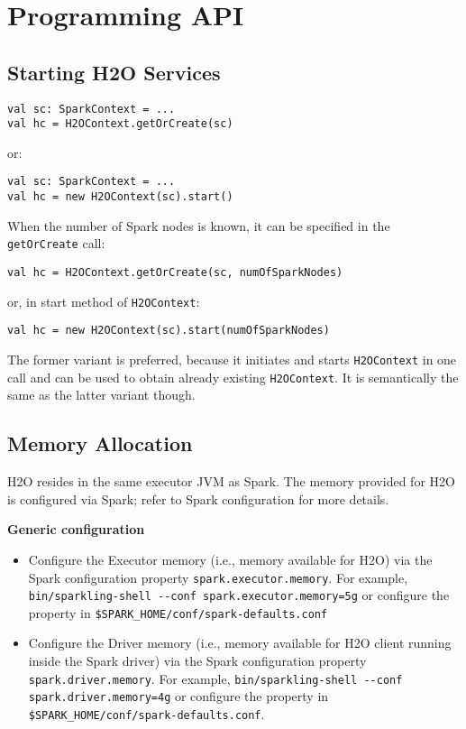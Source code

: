 \section{Programming API}

\subsection{Starting H2O Services}

\begin{lstlisting}[style=Scala]
val sc: SparkContext = ...
val hc = H2OContext.getOrCreate(sc)
\end{lstlisting} 
or:
\begin{lstlisting}[style=Scala]
val sc: SparkContext = ...
val hc = new H2OContext(sc).start()
\end{lstlisting}

When the number of Spark nodes is known, it can be specified in the \texttt{getOrCreate} call:

\begin{lstlisting}[style=Scala]
val hc = H2OContext.getOrCreate(sc, numOfSparkNodes)
\end{lstlisting}
or, in start method of \texttt{H2OContext}:

\begin{lstlisting}[style=Scala]
val hc = new H2OContext(sc).start(numOfSparkNodes)
\end{lstlisting}

The former variant is preferred, because it initiates and starts \texttt{H2OContext} in one call and can be used to obtain already existing \texttt{H2OContext}. It is semantically the same as the latter variant though.

\subsection{Memory Allocation}

H2O resides in the same executor JVM as Spark. The memory provided for H2O is configured via Spark; refer to Spark configuration for more details.

\textbf{Generic configuration}

\begin{itemize}
\item Configure the Executor memory (i.e., memory available for H2O) via the Spark configuration property \texttt{spark.executor.memory}. For example, {\lstinline[style=Bash]|bin/sparkling-shell --conf spark.executor.memory=5g|} or configure the property in {\lstinline[style=Bash]|$SPARK_HOME/conf/spark-defaults.conf|}
\item Configure the Driver memory (i.e., memory available for H2O client running inside the Spark driver) via the Spark configuration property \texttt{spark.driver.memory}. For example, {\lstinline[style=Bash]|bin/sparkling-shell --conf spark.driver.memory=4g|} or configure the property in {\lstinline[style=Bash]|$SPARK_HOME/conf/spark-defaults.conf|}.
\end{itemize}

